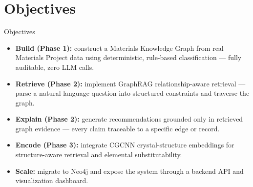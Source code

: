 \documentclass{beamer}
\begin{document}
\section{Objectives}
\begin{frame}{Objectives}
    \begin{itemize}
        \item \textbf{Build (Phase 1):} construct a Materials Knowledge Graph from real Materials Project data using deterministic, rule-based classification --- fully auditable, zero LLM calls.
        \item \textbf{Retrieve (Phase 2):} implement GraphRAG relationship-aware retrieval --- parse a natural-language question into structured constraints and traverse the graph.
        \item \textbf{Explain (Phase 2):} generate recommendations grounded only in retrieved graph evidence --- every claim traceable to a specific edge or record.
        \item \textbf{Encode (Phase 3):} integrate CGCNN crystal-structure embeddings for structure-aware retrieval and elemental substitutability.
        \item \textbf{Scale:} migrate to Neo4j and expose the system through a backend API and visualization dashboard.
    \end{itemize}
\end{frame}
\end{document}
